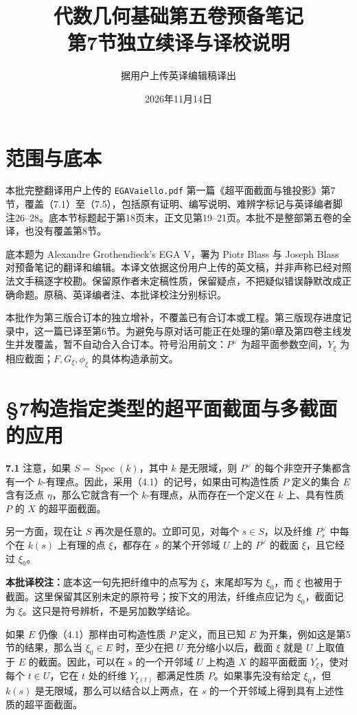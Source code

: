 \documentclass{ctexbook}
\title{代数几何基础第五卷预备笔记\\第7节独立续译与译校说明}
\author{据用户上传英译编辑稿译出}
\date{2026年11月14日}
\newcommand{\Spec}{\operatorname{Spec}}
\newcommand{\tnote}[1]{\par\smallskip\noindent\textbf{本批译校注：}#1\par\smallskip}
\newcommand{\entry}[2]{\par\bigskip\noindent\textbf{#1\quad #2}\quad}
\begin{document}
\maketitle
\frontmatter
\chapter*{范围与底本}
本批完整翻译用户上传的 \texttt{EGAVaiello.pdf} 第一篇《超平面截面与锥投影》第7节，覆盖（7.1）至（7.5），包括原有证明、编写说明、难辨字标记与英译编者脚注26--28。底本节标题起于第18页末，正文见第19--21页。本批不是整部第五卷的全译，也没有覆盖第8节。

底本题为 Alexandre Grothendieck's EGA V，署为 Piotr Blass 与 Joseph Blass 对预备笔记的翻译和编辑。本译文依据这份用户上传的英文稿，并非声称已经对照法文手稿逐字校勘。保留原作者未定稿性质，保留疑点，不把疑似错误静默改成正确命题。原稿、英译编者注、本批译校注分别标识。

本批作为第三版合订本的独立增补，不覆盖已有合订本或工程。第三版现存进度记录中，这一篇已译至第6节。为避免与原对话可能正在处理的第0章及第四卷主线发生并发覆盖，暂不自动合入合订本。符号沿用前文：$P^\vee$ 为超平面参数空间，$Y_\xi$ 为相应截面；$F,G_\xi,\phi_\xi$ 的具体构造承前文。

\mainmatter
\chapter*{§7\quad 构造指定类型的超平面截面与多截面的应用}
\entry{7.1}{}
注意，如果 $S=\Spec(k)$，其中 $k$ 是无限域，则 $P^\vee$ 的每个非空开子集都含有一个 $k$-有理点。因此，采用（4.1）的记号，如果由可构造性质 $P$ 定义的集合 $E$ 含有泛点 $\eta$，那么它就含有一个 $k$-有理点，从而存在一个定义在 $k$ 上、具有性质 $P$ 的 $X$ 的超平面截面。

另一方面，现在让 $S$ 再次是任意的。立即可见，对每个 $s\in S$，以及纤维 $P_s^\vee$ 中每个在 $k(s)$ 上有理的点 $\xi$，都存在 $s$ 的某个开邻域 $U$ 上的 $P^\vee$ 的截面 $\xi$，且它经过 $\xi_0$。
\tnote{底本这一句先把纤维中的点写为 $\xi$，末尾却写为 $\xi_0$，而 $\xi$ 也被用于截面。这里保留其区别未定的原符号；按下文的用法，纤维点应记为 $\xi_0$，截面记为 $\xi$。这只是符号辨析，不是另加数学结论。}
如果 $E$ 仍像（4.1）那样由可构造性质 $P$ 定义，而且已知 $E$ 为开集，例如这是第5节的结果，那么当 $\xi_0\in E$ 时，至少在把 $U$ 充分缩小以后，截面 $\xi$ 就是 $U$ 上取值于 $E$ 的截面。因此，可以在 $s$ 的一个开邻域 $U$ 上构造 $X$ 的超平面截面 $Y_\xi$，使对每个 $t\in U$，它在 $t$ 处的纤维 $Y_{\xi(t)}$ 都满足性质 $P$。如果事先没有给定 $\xi_0$，但 $k(s)$ 是无限域，那么可以结合以上两点，在 $s$ 的一个开邻域上得到具有上述性质的超平面截面。
\end{document}
